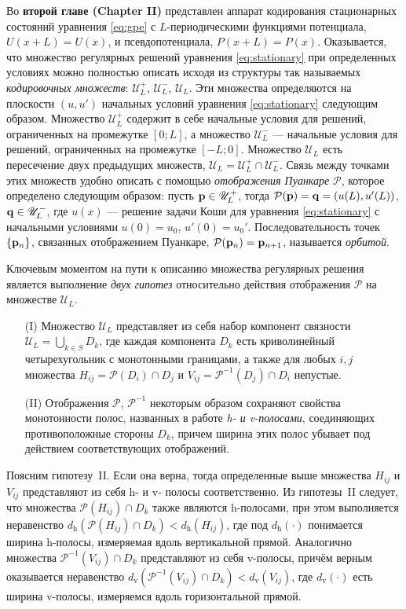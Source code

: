 \documentclass[candidate, href, colorlinks]{disser}
\begin{document}
Во \textbf{второй главе (Chapter II)} представлен аппарат кодирования стационарных состояний уравнения \eqref{eq:gpe} с $L$-периодическими функциями потенциала, $U(x + L) = U(x)$, и псевдопотенциала, $P(x + L) = P(x)$.
Оказывается, что множество регулярных решений уравнения \eqref{eq:stationary} при определенных условиях можно полностью описать исходя из структуры так называемых {\it кодировочных множеств}: $\mathscr{U}_L^+$, $\mathscr{U}_L^-$, $\mathscr{U}_L$.
Эти множества определяются на плоскости $(u, u')$ начальных условий уравнения \eqref{eq:stationary} следующим образом.
Множество $\mathscr{U}_L^+$ содержит в себе начальные условия для решений, ограниченных на промежутке $[0; L]$, а множество $\mathscr{U}_L^-$ --- начальные условия для решений, ограниченных на промежутке $[-L; 0]$.
Множество $\mathscr{U}_L$ есть пересечение двух предыдущих множеств, $\mathscr{U}_L = \mathscr{U}_L^+ \cap \mathscr{U}_L^-$.
Связь между точками этих множеств удобно описать с помощью {\it отображения Пуанкаре} $\mathcal{P}$, которое определено следующим образом: пусть $\vb{p} \in \mathscr{U}_L^+$, тогда $\mathcal{P} (\vb{p}) = \vb{q} = (u(L), u'(L))$, $\vb{q} \in \mathscr{U}_L^-$, где $u(x)$ --- решение задачи Коши для уравнения \eqref{eq:stationary} с начальными условиями $u(0) = u_0$, $u'(0) = u_0'$.
Последовательность точек $\{ \vb{p}_n \}$, связанных отображением Пуанкаре, $\mathcal{P}(\vb{p}_n) = \vb{p}_{n + 1}$, называется {\it орбитой}.

Ключевым моментом на пути к описанию множества регулярных решения является выполнение {\it двух гипотез} относительно действия отображения $\mathcal{P}$ на множестве $\mathscr{U}_L$.
\begin{itemize}
	\item[(I)] Множество $\mathscr{U}_L$ представляет из себя набор компонент связности $\mathscr{U}_L = \bigcup_{k \in S} D_k$, где каждая компонента $D_k$ есть криволинейный четырехугольник с монотонными границами, а также для любых $i, j$ множества $H_{ij} = \mathcal{P}(D_i) \cap D_j$ и $V_{ij} = \mathcal{P}^{-1}(D_j) \cap D_i$ непустые. 
	\item[(II)] Отображения $\mathcal{P}$, $\mathcal{P}^{-1}$ некоторым образом сохраняют свойства монотонности полос, названных в работе {\it h- и v-полосами}, соединяющих противоположные стороны $D_k$, причем ширина этих полос убывает под действием соответствующих отображений.
\end{itemize}
Поясним гипотезу~II.
Если она верна, тогда определенные выше множества $H_{ij}$ и $V_{ij}$ представляют из себя h- и v- полосы соответственно.
Из гипотезы~II следует, что множества $\mathcal{P}(H_{ij}) \cap D_k$ также являются h-полосами, при этом выполняется неравенство $d_{\mathrm{h}}(\mathcal{P}(H_{ij}) \cap D_k) < d_{\mathrm{h}}(H_{ij})$, где под $d_{\mathrm{h}}(\cdot)$ понимается ширина h-полосы, измеряемая вдоль вертикальной прямой.
Аналогично множества $\mathcal{P}^{-1}(V_{ij}) \cap D_k$ представляют из себя v-полосы, причём верным оказывается неравенство $d_{\mathrm{v}}(\mathcal{P}^{-1}(V_{ij}) \cap D_k) < d_{\mathrm{v}}(V_{ij})$, где $d_{\mathrm{v}}(\cdot)$ есть ширина v-полосы, измеряемся вдоль горизонтальной прямой.
\end{document}
